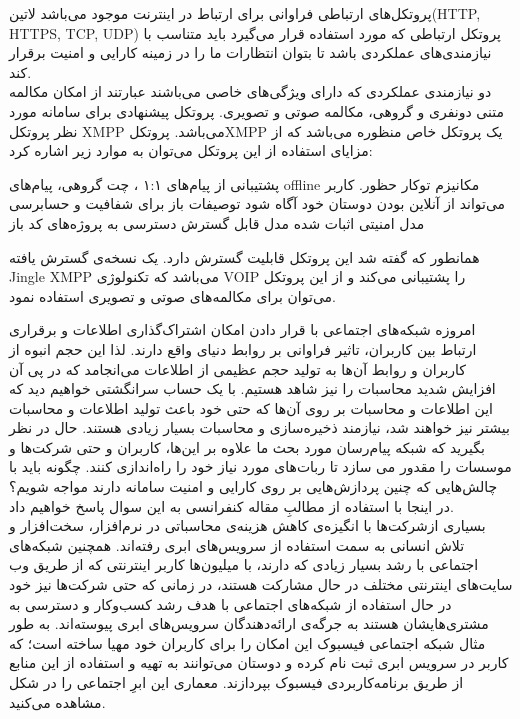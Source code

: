 پروتکل‌های ارتباطی فراوانی برای ارتباط در اینترنت موجود می‌باشد ‌لاتین{(HTTP, HTTPS, TCP, UDP) } پروتکل ارتباطی که مورد استفاده قرار می‌گیرد باید متناسب با نیازمندی‌های عملکردی  باشد تا بتوان انتظارات ما را در زمینه کارایی و امنیت برقرار کند.\\
دو نیازمندی عملکردی که دارای ویژگی‌های خاصی می‌باشند عبارتند از امکان مکالمه متنی دونفری و گروهی، مکالمه صوتی و تصویری. پروتکل پیشنهادی برای سامانه مورد نظر پروتکل XMPP   می‌باشد. پروتکلXMPP  یک پروتکل خاص منظوره می‌باشد که از مزایای استفاده از این پروتکل می‌توان به موارد زیر اشاره کرد:  



\begin{itemize}
 پشتیبانی از پیام‌های ۱:۱ ، چت گروهی، پیام‌های offline
 مکانیزم توکار حظور. کاربر می‌تواند از آنلاین بودن دوستان خود آگاه شود
 توصیفات باز برای شفافیت و حسابرسی
 مدل امنیتی اثبات شده
 مدل قابل گسترش
 دسترسی به پروژه‌های کد باز
\end{itemize}

همانطور که گفته شد این پروتکل قابلیت گسترش دارد. یک نسخه‌ی گسترش یافته Jingle XMPP می‌باشد که تکنولوژی VOIP را پشتیبانی می‌کند و از این پروتکل می‌توان برای مکالمه‌های صوتی و تصویری استفاده نمود. 


امروزه شبکه‌های اجتماعی با قرار دادن امکان اشتراک‌گذاری اطلاعات و برقراری ارتباط بین کاربران، تاثیر فراوانی بر روابط دنیای واقع دارند. لذا این حجم انبوه از کاربران و روابط آن‌ها به تولید حجم عظیمی از اطلاعات می‌انجامد که در پی آن افزایش شدید محاسبات را نیز شاهد هستیم. با یک حساب سرانگشتی خواهیم دید که این اطلاعات و محاسبات بر روی آن‌ها که حتی خود باعث تولید اطلاعات و محاسبات بیشتر نیز خواهند شد، نیازمند ذخیره‌سازی و محاسبات بسیار زیادی هستند. حال در نظر بگیرید که شبکه پیام‌رسان مورد بحث ما علاوه بر این‌ها، کاربران و حتی شرکت‌ها و موسسات را مقدور می سازد تا ربات‌‌های مورد نیاز خود را راه‌‌اندازی کنند. چگونه باید با چالش‌هایی که چنین پردازش‌هایی بر روی کارایی و امنیت سامانه دارند مواجه شویم؟ در اینجا با استفاده از مطالبِ مقاله کنفرانسی  به این سوال پاسخ خواهیم داد. \\
بسیاری ازشرکت‌ها با انگیزه‌ی کاهش هزینه‌ی محاسباتی در نرم‌افزار، سخت‌افزار و تلاش انسانی به سمت استفاده از سرویس‌های ابری رفته‌اند. همچنین شبکه‌های اجتماعی با رشد بسیار زیادی که دارند، با میلیون‌ها کاربر اینترنتی که از طریق وب سایت‌های اینترنتی مختلف در حال مشارکت هستند، در زمانی که حتی شرکت‌ها نیز خود در حال استفاده از شبکه‌های‌ اجتماعی با هدف رشد کسب‌وکار و دسترسی به مشتری‌هایشان هستند به جرگه‌ی ارائه‌دهندگان سرویس‌های ابری پیوسته‌اند. به طور مثال شبکه اجتماعی فیسبوک این امکان را برای کاربران خود مهیا ساخته است؛ که کاربر در سرویس ابری ثبت نام کرده و دوستان می‌توانند به تهیه و استفاده از این منابع از طریق برنامه‌کاربردی فیسبوک  بپردازند. معماری این ابرِ اجتماعی را در شکل  مشاهده می‌کنید.


